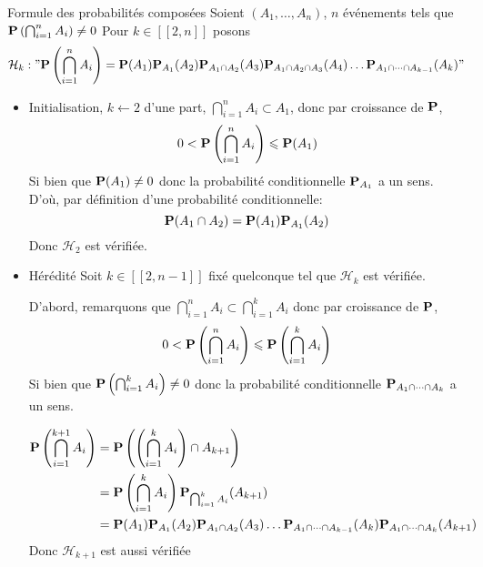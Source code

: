 \documentclass{article}
\begin{document}
\begin{question_kholle}{Formule des probabilités composées}
	Soient $(A_{1}, \dots, A_{n})$, $n$ événements tels que $\mathbf P\left( \bigcap_{i=1}^{n} A_{i} \right) \neq 0$
	Pour $k \in [ \! [ 2, n ] \!]$ posons 
	$$\mathcal{H}_{k} : " \mathbf P\left( \bigcap_{i=1}^{n}A_{i} \right) = \mathbf P(A_{1})\mathbf P_{A_{1}}(A_{2})\mathbf P_{A_{1} \cap A_{2}}(A_{3})\mathbf P_{A_{1} \cap A_{2} \cap A_{3}}(A_{4})\dots \mathbf P_{A_{1} \cap\dots \cap A_{k-1}}(A_{k})"$$
	\begin{itemize}[label=$\star$]
		
		
		\item Initialisation, $k \leftarrow 2$
		d'une part, $\bigcap_{i=1}^{n}A_{i} \subset A_{1}$, donc par croissance de $\mathbf P$, $$0<\mathbf P\left( \bigcap_{i=1}^{n}A_{i} \right) \leqslant \mathbf P(A_{1})$$
		Si bien que $\mathbf P(A_{1}) \neq 0$ donc la probabilité conditionnelle $\mathbf P_{A_{1}}$ a un sens.
		D'où, par définition d'une probabilité conditionnelle:
		$$\mathbf P(A_{1} \cap A_{2}) = \mathbf P(A_{1}) \mathbf P_{A_{1}}(A_{2})$$
		Donc $\mathcal{H}_{2}$ est vérifiée.
		
		\item Hérédité Soit $k \in [ \! [ 2, n - 1] \!]$ fixé quelconque tel que $\mathcal{H}_{k}$ est vérifiée.
		
		D'abord, remarquons que $\bigcap_{i=1}^{n}A_{i} \subset \bigcap_{i=1}^{k}A_{i}$ donc par croissance de $\mathbf P$,
		$$0 < \mathbf P\left( \bigcap_{i=1}^{n}A_{i} \right)\leqslant \mathbf P\left( \bigcap_{i=1}^{k}A_{i} \right)$$
		Si bien que $\mathbf P\left( \bigcap_{i=1}^{k} A_{i} \right) \neq 0$ donc la probabilité conditionnelle $\mathbf P_{A_{1}\cap\dots \cap A_{k}}$  a un sens.
		
		
		\begin{align*}
			\mathbf P\left( \bigcap_{i=1}^{k+1}A_{i} \right) 
			&= \mathbf P\left( \left( \bigcap_{i=1}^{k}A_{i} \right) \cap A_{k+1} \right) \\
			&= \mathbf P\left( \bigcap_{i=1}^{k}A_{i} \right)\mathbf P_{\bigcap _{i=1}^{k}A_{i}}(A_{k+1}) \\
			&= \mathbf P(A_{1})\mathbf P_{A_{1}}(A_{2})\mathbf P_{A_{1}\cap A_{2}}(A_{3})\dots \mathbf P_{A_{1} \cap \dots \cap A_{k-1}}(A_{k}) \mathbf P_{A_{1} \cap \dots \cap A_{k}}(A_{k+1})
		\end{align*}
		Donc $\mathcal{H}_{k+1}$ est aussi vérifiée
	\end{itemize}
\end{question_kholle}
\end{document}
